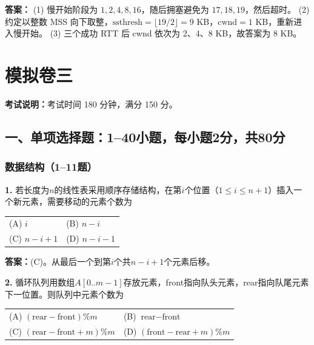 \ifshowsolutions\par\noindent\textbf{答案：} (1) 慢开始阶段为 $1,2,4,8,16$，随后拥塞避免为 $17,18,19$，然后超时。
(2) 约定以整数 MSS 向下取整，$\text{ssthresh}=\lfloor19/2\rfloor=9$ KB，$\text{cwnd}=1$ KB，重新进入慢开始。
(3) 三个成功 RTT 后 cwnd 依次为 2、4、8 KB，故答案为 8 KB。\else \answerarea[8] \fi

\newpage
\section{模拟卷三}

\noindent\textbf{考试说明：}考试时间 180 分钟，满分 150 分。

\subsection*{一、单项选择题：1--40小题，每小题2分，共80分}

\subsubsection*{数据结构（1--11题）}

\noindent\textbf{1.} 若长度为$n$的线性表采用顺序存储结构，在第$i$个位置（$1\leqslant i \leqslant n+1$）插入一个新元素，需要移动的元素个数为
\begin{center}
\begin{tabular}{ll}
(A) $i$ & (B) $n-i$ \\[6pt]
(C) $n-i+1$ & (D) $n-i-1$
\end{tabular}
\end{center}

\ifshowsolutions\par\noindent\textbf{答案：}(C)。从最后一个到第$i$个共$n-i+1$个元素后移。\else \answerarea \fi

\vspace{6pt}

\noindent\textbf{2.} 循环队列用数组$A[0..m-1]$存放元素，front指向队头元素，rear指向队尾元素下一位置。则队列中元素个数为
\begin{center}
\begin{tabular}{ll}
(A) $(\text{rear}-\text{front})\%m$ & (B) $\text{rear}-\text{front}$ \\[6pt]
(C) $(\text{rear}-\text{front}+m)\%m$ & (D) $(\text{front}-\text{rear}+m)\%m$
\end{tabular}
\end{center}

